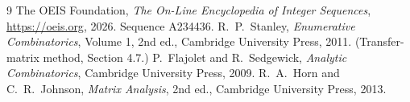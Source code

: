 \documentclass[11pt,a4paper]{article}
\theoremstyle{plain}
\theoremstyle{definition}
\begin{document}
\begin{thebibliography}{9}
 The OEIS Foundation, \emph{The On-Line Encyclopedia of Integer
Sequences}, \url{https://oeis.org}, 2026. Sequence A234436.
 R.~P.~Stanley, \emph{Enumerative Combinatorics}, Volume 1, 2nd ed.,
Cambridge University Press, 2011. (Transfer-matrix method, Section 4.7.)
 P.~Flajolet and R.~Sedgewick, \emph{Analytic Combinatorics}, Cambridge
University Press, 2009.
 R.~A.~Horn and C.~R.~Johnson, \emph{Matrix Analysis}, 2nd ed., Cambridge
University Press, 2013.
\end{thebibliography}
\end{document}
